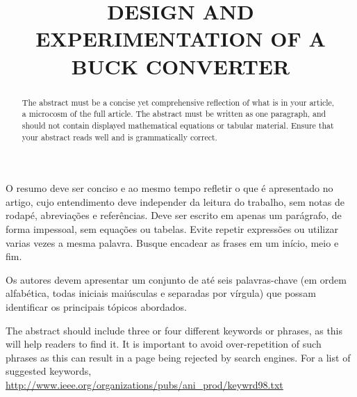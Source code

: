 \title{DESIGN AND EXPERIMENTATION OF A BUCK CONVERTER} %

\maketitle




\begin{resumo}  O resumo deve ser conciso e ao mesmo tempo refletir o que é apresentado no artigo, cujo entendimento deve independer da leitura do trabalho, sem notas de rodapé, abreviações e referências. Deve ser escrito em apenas um parágrafo, de forma impessoal, sem equações ou tabelas. Evite repetir expressões ou utilizar varias vezes a mesma palavra. Busque encadear as frases em um início, meio e fim.
\end{resumo}

\begin{palavraschave }
		Os autores devem apresentar um conjunto de até seis palavras-chave (em ordem alfabética, todas iniciais maiúsculas e separadas por vírgula) que possam identificar os principais tópicos abordados.	
\end{palavraschave }

\englishtitle

\begin{abstract}
	The abstract must be a concise yet comprehensive reflection of what is in your article, a microcosm of the full article. The abstract must be written as one paragraph, and should not contain displayed mathematical equations or tabular material.  Ensure that your abstract reads well and is grammatically correct.
\end{abstract}

\begin{keywords}
	The abstract should include three or four different keywords or phrases, as this will help readers to find it. It is important to avoid over-repetition of such phrases as this can result in a page being rejected by search engines. For a list of suggested keywords, \url{http://www.ieee.org/organizations/pubs/ani_prod/keywrd98.txt}
\end{keywords}

